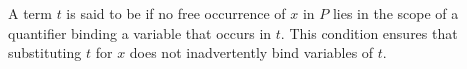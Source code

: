 A term $t$ is said to be  if no free occurrence of $x$ in $P$ lies in the scope of a quantifier binding a variable that occurs in $t$. This condition ensures that substituting $t$ for $x$ does not inadvertently bind variables of $t$.
